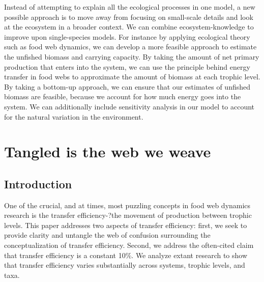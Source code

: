 \documentclass[oneside,12pt,final]{sty/ucthesis-CA2012}
\begin{document}
\begin{mainmatter}
Instead of attempting to explain all the ecological processes in one model, a new possible approach is to move away from focusing on small-scale details and look at the ecosystem in a broader context. We can combine ecosystem-knowledge to improve upon single-species models. For instance by applying ecological theory such as food web dynamics, we can develop a more feasible approach to estimate the unfished biomass and carrying capacity. By taking the amount of net primary production that enters into the system, we can use the principle behind energy transfer in food webs to approximate the amount of biomass at each trophic level. By taking a bottom-up approach, we can ensure that our estimates of unfished biomass are feasible, because we account for how much energy goes into the system. We can additionally include sensitivity analysis in our model to account for the natural variation in the environment.

%
%

\chapter{Tangled is the web we weave}
\section{Introduction}
One of the crucial, and at times, most puzzling concepts in food web dynamics research is the transfer efficiency-?the movement of production between trophic levels. This paper addresses two aspects of transfer efficiency: first, we seek to provide clarity and untangle the web of confusion surrounding the conceptualization of transfer efficiency. Second, we address the often-cited claim that transfer efficiency is a constant 10\%. We analyze extant research to show that transfer efficiency varies substantially across systems, trophic levels, and taxa. 


\end{mainmatter}
\end{document}
